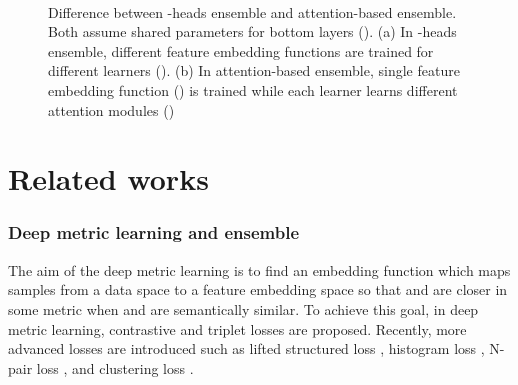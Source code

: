 \documentclass[runningheads]{llncs}
\begin{document}
\begin{figure}[t]
\begin{center}
    \mbox{
    }
\end{center}
\vspace{-7mm}
\caption{Difference between -heads ensemble and attention-based ensemble.
Both assume shared parameters for bottom layers ().
(a) In -heads ensemble, different feature embedding functions are trained for different learners ().
(b) In attention-based ensemble, single feature embedding function () is trained while each learner learns different attention modules ()
\vspace{-6mm}
}
\label{fig:m_heads_and_m_way}
\end{figure}
 
\vspace{-2mm}
\section{Related works}
\vspace{-3mm}
\subsubsection{Deep metric learning and ensemble}
\label{sec:ensemble}

The aim of the deep metric learning is to find an embedding function  which maps samples  from a data space  to a feature embedding space  so that  and  are closer in some metric when  and  are semantically similar.
To achieve this goal, in deep metric learning, contrastive \cite{hadsell2006dimensionality,chopra2005learning} and triplet \cite{weinberger2009distance,schroff2015facenet} losses are proposed.
Recently, more advanced losses are introduced such as lifted structured loss \cite{oh2016deep}, histogram loss \cite{ustinova2016learning}, N-pair loss \cite{sohn2016improved}, and clustering loss \cite{song2017deep,law2017deep}.
\end{document}
